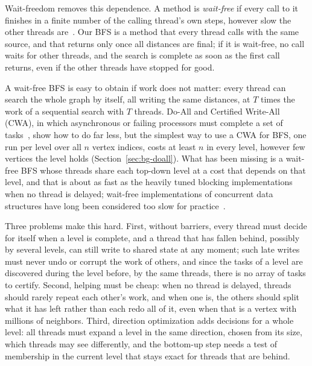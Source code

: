 Wait-freedom removes this dependence. A method is \emph{wait-free} if every call to it finishes in a finite number of the calling thread's own steps, however slow the other threads are~\cite{herlihy_waitfree, aomp}. Our BFS is a method that every thread calls with the same source, and that returns only once all distances are final; if it is wait-free, no call waits for other threads, and the search is complete as soon as the first call returns, even if the other threads have stopped for good.

A wait-free BFS is easy to obtain if work does not matter: every thread can search the whole graph by itself, all writing the same distances, at $T$ times the work of a sequential search with $T$ threads. Do-All and Certified Write-All (CWA), in which asynchronous or failing processors must complete a set of tasks~\cite{kanellakis_robust, martel_cwa, georgiou_doall}, show how to do far less, but the simplest way to use a CWA for BFS, one run per level over all $n$ vertex indices, costs at least $n$ in every level, however few vertices the level holds (Section~\ref{sec:bg-doall}). What has been missing is a wait-free BFS whose threads share each top-down level at a cost that depends on that level, and that is about as fast as the heavily tuned blocking implementations when no thread is delayed; wait-free implementations of concurrent data structures have long been considered too slow for practice~\cite{kogan_fastwf}.

Three problems make this hard. First, without barriers, every thread must decide for itself when a level is complete, and a thread that has fallen behind, possibly by several levels, can still write to shared state at any moment; such late writes must never undo or corrupt the work of others, and since the tasks of a level are discovered during the level before, by the same threads, there is no array of tasks to certify. Second, helping must be cheap: when no thread is delayed, threads should rarely repeat each other's work, and when one is, the others should split what it has left rather than each redo all of it, even when that is a vertex with millions of neighbors. Third, direction optimization adds decisions for a whole level: all threads must expand a level in the same direction, chosen from its size, which threads may see differently, and the bottom-up step needs a test of membership in the current level that stays exact for threads that are behind.

